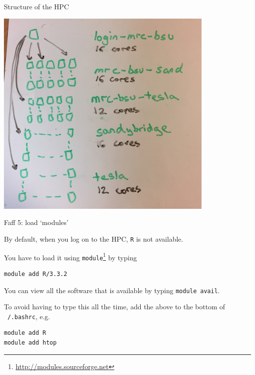 \documentclass[t,10pt]{beamer}
\let\oldfootnote\footnote
\renewcommand\footnote[1][]{\oldfootnote[frame,#1]}
\begin{document}
\begin{frame}{Structure of the HPC}

\centering
\includegraphics[width=0.8\textwidth]{hpc-structure2}
\end{frame}

\begin{frame}[fragile]{Faff 5: load `modules'}

By default, when you log on to the HPC, \texttt{R} is \alert{not available}.

\bigskip
You have to load it using \texttt{module}\footnote{\url{http://modules.sourceforge.net}} by typing

\begin{verbatim}
module add R/3.3.2
\end{verbatim}

You can view all the software that is available by typing \texttt{module avail}.

\bigskip
To avoid having to type this all the time, add the above to the bottom of \texttt{~/.bashrc}, e.g.

\begin{verbatim}
module add R
module add htop
\end{verbatim}
\end{frame}
\end{document}
